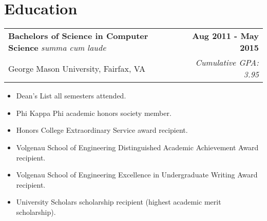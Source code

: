 \documentclass[letterpaper]{article}
\newenvironment{details}
{\begin{itemize}}
{\end{itemize}}
\begin{document}
  \setcounter{secnumdepth}{0}

  \section{Education}

  \noindent
  \begin{tabularx}{\textwidth}{@{}X r@{}}
    \textbf{Bachelors of Science in Computer Science} \emph{summa cum laude} & \textbf{Aug 2011 - May 2015} \\
    George Mason University, Fairfax, VA & \emph{Cumulative GPA: 3.95}
  \end{tabularx}

  \begin{details}
  \item Dean's List all semesters attended.
  \item Phi Kappa Phi academic honors society member.
  \item Honors College Extraordinary Service award recipient.
  \item Volgenau School of Engineering Distinguished Academic Achievement Award recipient.
  \item Volgenau School of Engineering Excellence in Undergraduate Writing Award recipient.
  \item University Scholars scholarship recipient (highest academic merit scholarship).
  \end{details}
\end{document}
